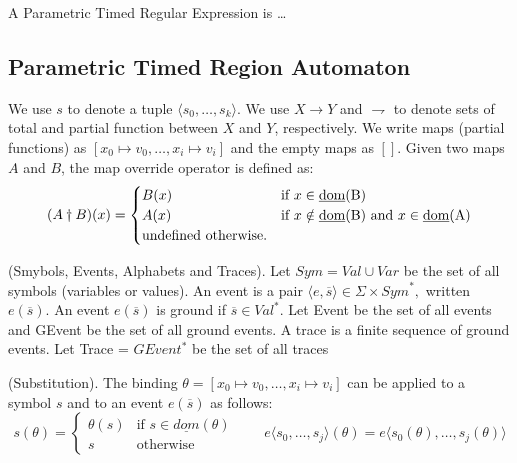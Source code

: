 		\begin{dfn}
		A Parametric Timed Regular Expression is \dots %
		\end{dfn}
	
		\subsection{Parametric Timed Region Automaton}
			
			
			We use $s$ to denote a tuple $\langle s_0,\dots,s_k \rangle$. We use $X \rightarrow Y$ and $\rightharpoondown$ to denote sets of total and partial function between
			$X$ and $Y$, respectively. We write maps (partial functions) as $[x_0 \mapsto v_0,\dots,x_i \mapsto v_i]$ and the empty maps as $[]$. Given two maps $A$ and $B$,
			the map override operator is defined as:
				\[
				 (A \dagger B)(x) = 
				  \begin{cases} 
				   B(x) & \text{if } x \in \text{\underline{dom}(B)} \\
				   A(x) & \text{if } x \notin \text{\underline{dom}(B)} \text{ and } x \in \text{\underline{dom}(A)} \\
				   \text{undefined otherwise.}
				  \end{cases}
				\]
 			
			\begin{dfn}
				(Smybols, Events, Alphabets and Traces).
				Let $\mathit{Sym} = \mathit{Val} \cup \mathit{Var}$ be the set of all symbols (variables or values).
				An event is a pair $\langle e, \overline{s} \rangle \in \Sigma \times \mathit{Sym}^\ast,$ written $e(\overline{s})$.
				An event $e(\overline{s})$ is ground if $\overline{s} \in \mathit{Val}^\ast$.
				Let Event be the set of all events and GEvent be the set of all ground events.
				A trace is a finite sequence of ground events.
				Let Trace = $GEvent^\ast$ be the set of all traces
			\end{dfn}
			
			\begin{dfn}
				(Substitution).
				The binding $\theta = [x_0 \mapsto v_0, \dots, x_i \mapsto v_i]$ can be applied to a symbol $s$ and to an event
				$e(\overline{s})$ as follows: 
				\[
				 s(\theta) = 
				  \begin{cases} 
				   \theta(s) & \text{if } s \in \underline{dom}(\theta) \\
				   s & \text{otherwise}
				  \end{cases}
				  \qquad e \langle s_0,\ldots,s_j \rangle (\theta) = e \langle s_0(\theta),\ldots,s_j(\theta) \rangle
				\]
			\end{dfn}
			
